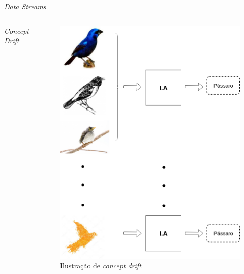 \begin{frame}{\textit{Data Streams}}
	\begin{columns}
	    \centering
	        \textit{Concept Drift}
	        \begin{figure}
        	    \centering
        	    \includegraphics[height=.55\textheight,width=\textwidth,keepaspectratio]{figuras/passaros_brancas.png}
        	    \caption{Ilustração de \textit{concept drift}}
        	    \label{fig:concept_drift}
        	\end{figure}
	        

\end{columns}
\end{frame}
